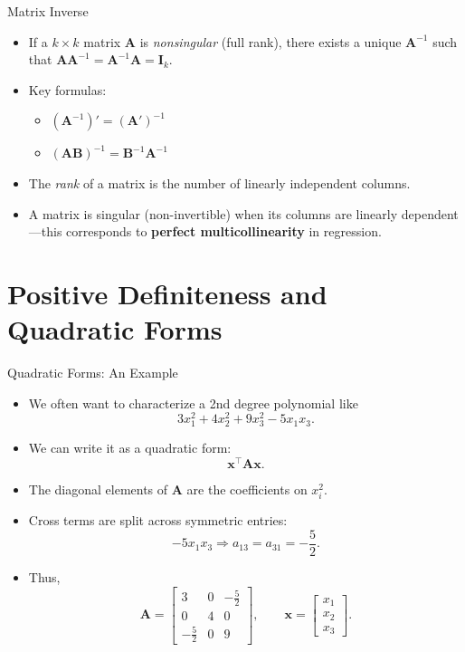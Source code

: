 \documentclass[aspectratio=169, handout, t]{beamer}
\numberwithin{equation}{section}
\begin{document}
\begin{frame}{Matrix Inverse}
\begin{itemize}
\item If a $k \times k$ matrix $\bm{A}$ is \emph{nonsingular} (full rank), there exists a unique $\bm{A}^{-1}$ such that $\bm{A}\bm{A}^{-1}=\bm{A}^{-1}\bm{A}=\bm{I}_k$.\pause
\item Key formulas:
\begin{itemize}
\item $(\bm{A}^{-1})'=(\bm{A}')^{-1}$
\item $(\bm{AB})^{-1}=\bm{B}^{-1}\bm{A}^{-1}$
\end{itemize}\pause
\item The \emph{rank} of a matrix is the number of linearly independent columns.
\item A matrix is singular (non-invertible) when its columns are linearly dependent---this corresponds to \textbf{perfect multicollinearity} in regression.
\end{itemize}
\end{frame}



\section[Pos. Definite]{Positive Definiteness and Quadratic Forms}


\begin{frame}{Quadratic Forms: An Example}
\begin{itemize}
\item We often want to characterize a 2nd degree polynomial like
\[
3x_1^2 + 4x_2^2 + 9x_3^2 - 5x_1x_3.
\]

\item We can write it as a quadratic form:
\[
\bm{x}^\top \bm{A} \bm{x}.
\]

\item The diagonal elements of $\bm{A}$ are the coefficients on $x_i^2$.

\item Cross terms are split across symmetric entries:
\[
-5x_1x_3 \Rightarrow a_{13}=a_{31}=-\frac{5}{2}.
\]

\item Thus,
\[
\bm{A}=
\begin{bmatrix}
3 & 0 & -\frac{5}{2} \\
0 & 4 & 0 \\
-\frac{5}{2} & 0 & 9
\end{bmatrix},
\qquad
\bm{x}=
\begin{bmatrix}
x_1\\
x_2\\
x_3
\end{bmatrix}.
\]

\end{itemize}
\end{frame}
\end{document}
